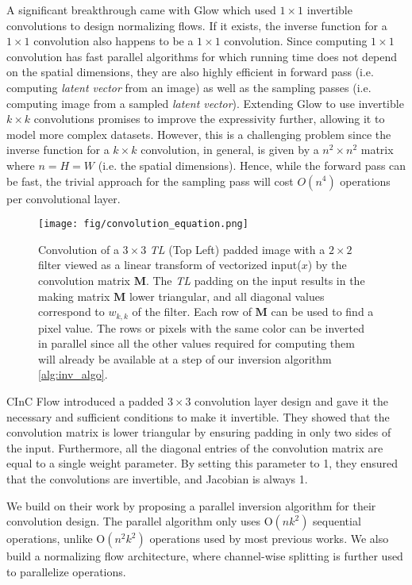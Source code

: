 \documentclass[a4paper,twoside]{article}
\theoremstyle{definition}
\begin{document}
A significant breakthrough came with Glow \citep{kingma2018glow} which used $1\times 1$ invertible convolutions to design normalizing flows. If it exists, the inverse function for a $1 \times 1$ convolution also happens to be a $1\times 1$ convolution. Since computing $1 \times 1$ convolution has fast parallel algorithms for which running time does not depend on the spatial dimensions, they are also highly efficient in forward pass (i.e. computing \emph{latent vector} from an image) as well as the sampling passes (i.e. computing image from a sampled \emph{latent vector}). Extending Glow to use invertible $k\times k$ convolutions promises to improve the expressivity further, allowing it to model more complex datasets. However, this is a challenging problem since the inverse function for a $k \times k$ convolution, in general, is given by a $n^{2} \times n^{2}$ matrix where $n = H = W$ (i.e. the spatial dimensions). Hence, while the forward pass can be fast, the trivial approach for the sampling pass will cost $O(n^4)$ operations per convolutional layer.


\begin{figure*}[!th]
    \centering
    \texttt{[image: fig/convolution\_equation.png]}
    \caption{Convolution of a $3 \times 3$ \emph{TL} (Top Left) padded image with a $2 \times 2$ filter viewed as a linear transform of vectorized input($x$) by the convolution matrix $\textbf{M}$. The \emph{TL} padding on the input results in the making matrix $\textbf{M}$ lower triangular, and all diagonal values correspond to $w_{k,k}$ of the filter. Each row of $\textbf{M}$ can be used to find a pixel value. The rows or pixels with the same color can be inverted in parallel since all the other values required for computing them will already be available at a step of our inversion algorithm \ref{alg:inv_algo}.}
    \label{fig:Conv_equn}
\end{figure*}



CInC Flow \citep{nagar2021cinc} introduced a padded $3 \times 3$ convolution layer design and gave it the necessary and sufficient conditions to make it invertible. They showed that the convolution matrix is lower triangular by ensuring padding in only two sides of the input. Furthermore, all the diagonal entries of the convolution matrix are equal to a single weight parameter. By setting this parameter to 1, they ensured that the convolutions are invertible, and Jacobian is always 1.

We build on their work by proposing a parallel inversion algorithm for their convolution design. The parallel algorithm only uses  O$(n k^2)$ sequential operations, unlike O$(n^2 k^2)$ operations used by most previous works. We also build a normalizing flow architecture, where channel-wise splitting is further used to parallelize operations.
\end{document}
